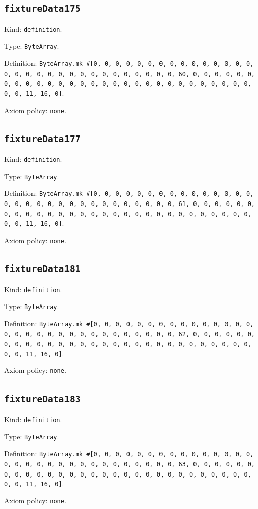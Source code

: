 \documentclass[11pt]{article}
\begin{document}
\subsection*{\texttt{fixtureData175}}
\noindent Kind: \texttt{definition}.\par
\noindent Type: \texttt{ByteArray}.\par
\noindent Definition: \texttt{ByteArray.mk \#[0, 0, 0, 0, 0, 0, 0, 0, 0, 0, 0, 0, 0, 0, 0, 0, 0, 0, 0, 0, 0, 0, 0, 0, 0, 0, 0, 0, 0, 0, 0, 60, 0, 0, 0, 0, 0, 0, 0, 0, 0, 0, 0, 0, 0, 0, 0, 0, 0, 0, 0, 0, 0, 0, 0, 0, 0, 0, 0, 0, 0, 0, 0, 11, 16, 0]}.\par
\noindent Axiom policy: \texttt{none}.\par
\subsection*{\texttt{fixtureData177}}
\noindent Kind: \texttt{definition}.\par
\noindent Type: \texttt{ByteArray}.\par
\noindent Definition: \texttt{ByteArray.mk \#[0, 0, 0, 0, 0, 0, 0, 0, 0, 0, 0, 0, 0, 0, 0, 0, 0, 0, 0, 0, 0, 0, 0, 0, 0, 0, 0, 0, 0, 0, 0, 61, 0, 0, 0, 0, 0, 0, 0, 0, 0, 0, 0, 0, 0, 0, 0, 0, 0, 0, 0, 0, 0, 0, 0, 0, 0, 0, 0, 0, 0, 0, 0, 11, 16, 0]}.\par
\noindent Axiom policy: \texttt{none}.\par
\subsection*{\texttt{fixtureData181}}
\noindent Kind: \texttt{definition}.\par
\noindent Type: \texttt{ByteArray}.\par
\noindent Definition: \texttt{ByteArray.mk \#[0, 0, 0, 0, 0, 0, 0, 0, 0, 0, 0, 0, 0, 0, 0, 0, 0, 0, 0, 0, 0, 0, 0, 0, 0, 0, 0, 0, 0, 0, 0, 62, 0, 0, 0, 0, 0, 0, 0, 0, 0, 0, 0, 0, 0, 0, 0, 0, 0, 0, 0, 0, 0, 0, 0, 0, 0, 0, 0, 0, 0, 0, 0, 11, 16, 0]}.\par
\noindent Axiom policy: \texttt{none}.\par
\subsection*{\texttt{fixtureData183}}
\noindent Kind: \texttt{definition}.\par
\noindent Type: \texttt{ByteArray}.\par
\noindent Definition: \texttt{ByteArray.mk \#[0, 0, 0, 0, 0, 0, 0, 0, 0, 0, 0, 0, 0, 0, 0, 0, 0, 0, 0, 0, 0, 0, 0, 0, 0, 0, 0, 0, 0, 0, 0, 63, 0, 0, 0, 0, 0, 0, 0, 0, 0, 0, 0, 0, 0, 0, 0, 0, 0, 0, 0, 0, 0, 0, 0, 0, 0, 0, 0, 0, 0, 0, 0, 11, 16, 0]}.\par
\noindent Axiom policy: \texttt{none}.\par
\end{document}
